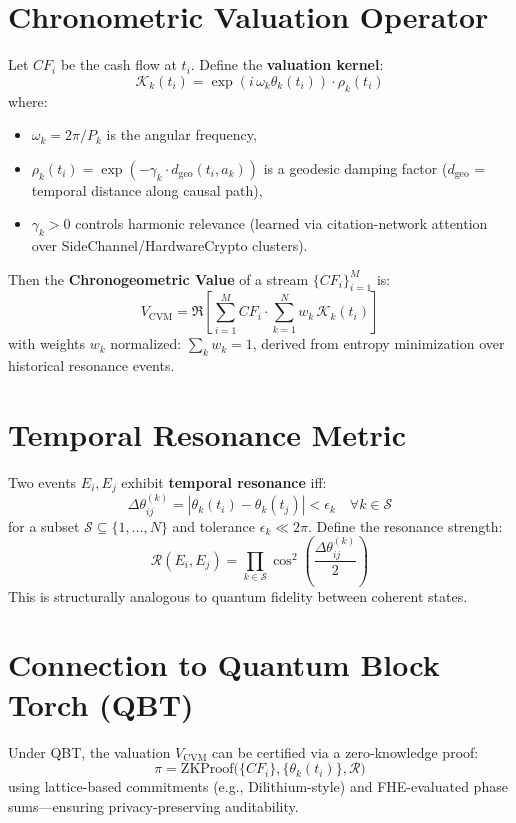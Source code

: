 \documentclass[11pt]{article}
\begin{document}
\section{Chronometric Valuation Operator}
Let $CF_i$ be the cash flow at $t_i$. Define the \textbf{valuation kernel}:
\begin{equation}
\mathcal{K}_k(t_i) = \exp\left( i \, \omega_k \theta_k(t_i) \right) \cdot \rho_k(t_i)
\end{equation}
where:
\begin{itemize}
\item $\omega_k = 2\pi / P_k$ is the angular frequency,
\item $\rho_k(t_i) = \exp\left(-\gamma_k \cdot d_{\text{geo}}(t_i, a_k)\right)$ is a geodesic
damping factor ($d_{\text{geo}}$ = temporal distance along causal path),
\item $\gamma_k > 0$ controls harmonic relevance (learned via citation-network attention
over SideChannel/HardwareCrypto clusters).
\end{itemize}
Then the \textbf{Chronogeometric Value} of a stream $\{CF_i\}_{i=1}^M$ is:
\begin{equation}
\boxed{
V_{\text{CVM}} = \Re\left[ \sum_{i=1}^M CF_i \cdot \sum_{k=1}^{N} w_k \, \mathcal{K}_k(t_i)
\right]
}
\end{equation}
with weights $w_k$ normalized: $\sum_k w_k = 1$, derived from entropy minimization over
historical resonance events.

\section{Temporal Resonance Metric}
Two events $E_i, E_j$ exhibit \textbf{temporal resonance} iff:
\begin{equation}
\Delta\theta_{ij}^{(k)} = \left| \theta_k(t_i) - \theta_k(t_j) \right| < \epsilon_k \quad \forall k \in
\mathcal{S}
\end{equation}
for a subset $\mathcal{S} \subseteq \{1,\dots,N\}$ and tolerance $\epsilon_k \ll 2\pi$. Define the
resonance strength:
\begin{equation}
\mathcal{R}(E_i, E_j) = \prod_{k \in \mathcal{S}} \cos^2\left( \frac{\Delta\theta_{ij}^{(k)}}{2} \right)
\end{equation}
This is structurally analogous to quantum fidelity between coherent states.

\section{Connection to Quantum Block Torch (QBT)}
Under QBT, the valuation $V_{\text{CVM}}$ can be certified via a zero-knowledge proof:
\[
\pi = \text{ZKProof}\big( \{CF_i\}, \{\theta_k(t_i)\}, \mathcal{R} \big)
\]
using lattice-based commitments (e.g., Dilithium-style) and FHE-evaluated phase
sums—ensuring privacy-preserving auditability.
\end{document}
